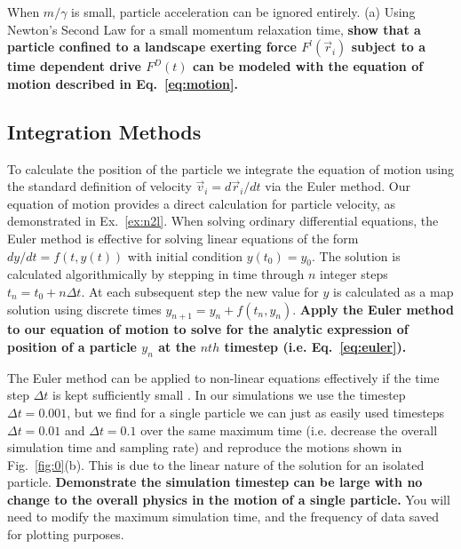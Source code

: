 \documentclass[twocolumn,preprintnumbers,amsmath,amssymb,aps,prx]{revtex4}
\begin{document}
  When $m/\gamma$ is small,
  particle acceleration can be ignored
  entirely.
  (a) Using Newton's Second Law for
  a small momentum relaxation time, 
  {\bf show that a particle confined to a landscape exerting force
  $F^l(\vec{r}_i)$ subject to a time dependent drive $F^D(t)$
  can be modeled with the equation of motion described in 
  Eq.~\ref{eq:motion}. }


  \subsection{Integration Methods}
  \label{ex:euler}
    To calculate the position of the particle we
    integrate the equation of motion using
    the standard definition of velocity
    $\vec{v}_i = d\vec{r}_i/dt$ 
    via the 
    Euler method. %
    Our equation of motion provides
    a direct calculation for particle velocity,
    as demonstrated in Ex.~\ref{ex:n2l}.  
  When solving ordinary differential equations,
  the Euler method is effective for solving linear equations
  of the form
  $dy/dt = f(t,y(t))$ with initial condition $y(t_0) = y_0$.
  The solution is calculated algorithmically
  by stepping in time through $n$ integer steps
  $t_n = t_0 + n \Delta t$.
  At each subsequent step the new
  value for $y$ is calculated as a map solution using
  discrete times 
  $y_{n+1} = y_n + f(t_n,y_n)$.
    {\bf Apply the Euler method to our equation
  of motion to solve for the analytic expression
  of position of a particle
  $y_n$ at the $nth$ timestep (i.e. Eq.~\ref{eq:euler}).}
    
  The Euler method can be applied to non-linear
  equations effectively if the time step $\Delta t$
  is kept sufficiently small \cite{Newman}.
  In our simulations we use the timestep $\Delta t = 0.001$,
  but we find for a single particle
  we can just as easily used 
  timesteps $\Delta t = 0.01$ and $\Delta t = 0.1$
  over the same maximum time
  (i.e. decrease the overall simulation time and sampling rate)
  and reproduce the motions shown in Fig.~\ref{fig:0}(b).
  This is due to the linear nature of the solution
  for an isolated particle.
  {\bf Demonstrate the simulation timestep 
  can be large
  with no change to the overall physics
  in the motion of a single particle.}
  You will need to modify the maximum
  simulation time, and the frequency of data saved for plotting purposes.
\end{document}

